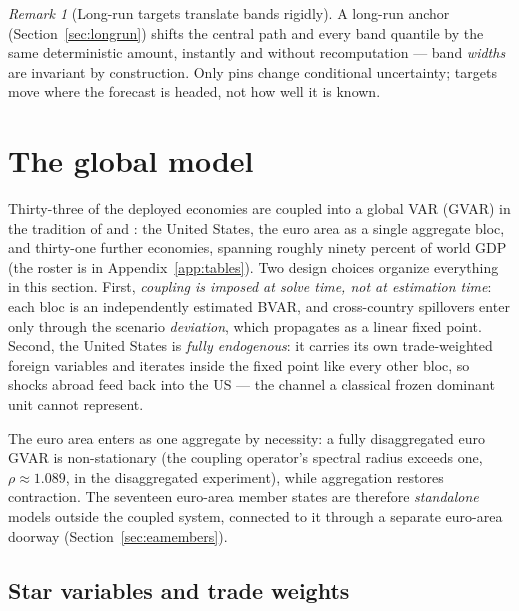\documentclass[11pt]{article}
\theoremstyle{plain}
\theoremstyle{remark}
\newtheorem{remark}{Remark}
\begin{document}
\begin{remark}[Long-run targets translate bands rigidly]\label{rem:bandrigid}
A long-run anchor (Section~\ref{sec:longrun}) shifts the central path
and every band quantile by the same deterministic amount, instantly and
without recomputation --- band \emph{widths} are invariant by
construction. Only pins change conditional uncertainty; targets move
where the forecast is headed, not how well it is known.
\end{remark}

\section{The global model}\label{sec:gvar}

Thirty-three of the deployed economies are coupled into a global VAR
(GVAR) in the tradition of \citet{PesaranSchuermannWeiner2004} and
\citet{DeesDiMauroPesaranSmith2007}: the United States, the euro area as
a single aggregate bloc, and thirty-one further economies, spanning
roughly ninety percent of world GDP (the roster is in
Appendix~\ref{app:tables}). Two design choices organize everything in
this section. First, \emph{coupling is imposed at solve time, not at
estimation time}: each bloc is an independently estimated BVAR, and
cross-country spillovers enter only through the scenario
\emph{deviation}, which propagates as a linear fixed point. Second, the
United States is \emph{fully endogenous}: it carries its own
trade-weighted foreign variables and iterates inside the fixed point
like every other bloc, so shocks abroad feed back into the US --- the
channel a classical frozen dominant unit cannot represent.

The euro area enters as one aggregate by necessity: a fully
disaggregated euro GVAR is non-stationary (the coupling operator's
spectral radius exceeds one, $\rho \approx 1.089$, in the disaggregated
experiment), while aggregation restores contraction. The seventeen
euro-area member states are therefore \emph{standalone} models outside
the coupled system, connected to it through a separate euro-area doorway
(Section~\ref{sec:eamembers}).

\subsection{Star variables and trade weights}\label{sec:stars}
\end{document}
